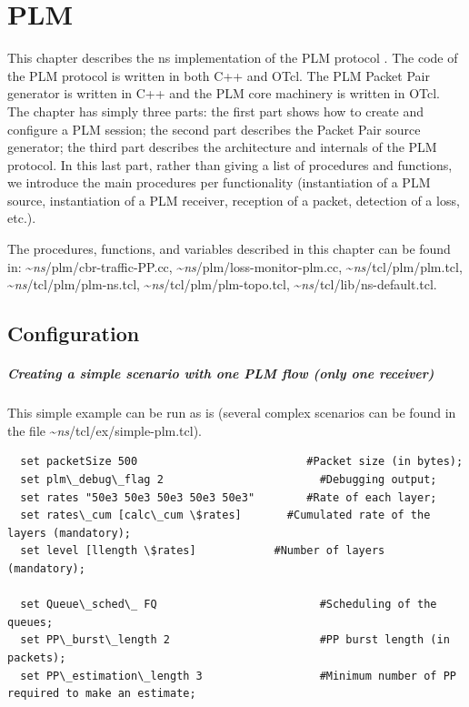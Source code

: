 \chapter{PLM}
{\sloppy
\label{sec:PLM}
This chapter describes the ns  implementation of the PLM protocol
\cite{legout_sigmetrics2000}. The code of the PLM 
protocol  is written in both C++ and OTcl. The PLM Packet Pair generator is
written in C++ and the PLM core machinery is written in OTcl. The chapter has simply
three parts: the first part shows how to create and configure a PLM session; the
second part describes the Packet Pair source generator; the third part describes
the architecture and internals of the PLM protocol. In this last part, rather
than giving a list of procedures and functions, we introduce the main
procedures per functionality (instantiation of a PLM source, instantiation of a
PLM receiver, reception of a packet, detection of a loss, etc.).

The procedures, functions, and variables described in this chapter can be found in:
\textasciitilde\emph{ns}/{plm/cbr-traffic-PP.cc}, \textasciitilde\emph{ns}/{plm/loss-monitor-plm.cc}, \textasciitilde\emph{ns}/{tcl/plm/plm.tcl},
\textasciitilde\emph{ns}/{tcl/plm/plm-ns.tcl}, \textasciitilde\emph{ns}/{tcl/plm/plm-topo.tcl}, \textasciitilde\emph{ns}/{tcl/lib/ns-default.tcl}.

\section{Configuration}
\label{sec:Configuration}
\paragraph{Creating a simple scenario with one PLM flow (only one receiver)\\}
This simple example can be run as is (several complex scenarios can be found in
the file \textasciitilde\emph{ns}/{tcl/ex/simple-plm.tcl}).

\begin{verbatim}
  set packetSize 500                          #Packet size (in bytes);
  set plm\_debug\_flag 2                        #Debugging output;
  set rates "50e3 50e3 50e3 50e3 50e3"        #Rate of each layer;
  set rates\_cum [calc\_cum \$rates]       #Cumulated rate of the layers (mandatory);
  set level [llength \$rates]            #Number of layers (mandatory);
  
  set Queue\_sched\_ FQ                         #Scheduling of the queues;
  set PP\_burst\_length 2                       #PP burst length (in packets);
  set PP\_estimation\_length 3                  #Minimum number of PP required to make an estimate;


\end{verbatim}}
